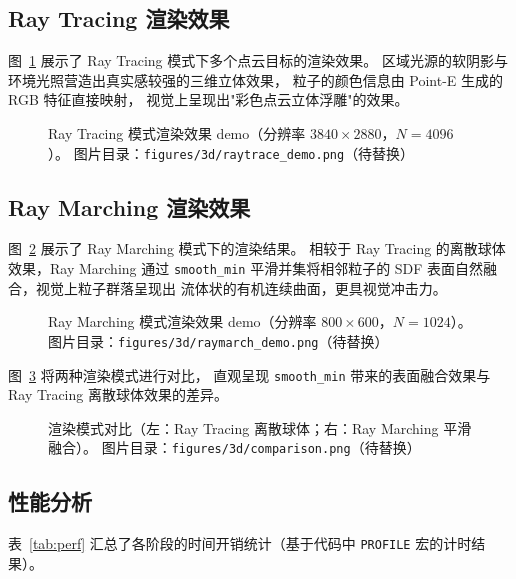 \subsection{Ray Tracing 渲染效果}

图~\ref{fig:raytrace_demo} 展示了 Ray Tracing 模式下多个点云目标的渲染效果。
区域光源的软阴影与环境光照营造出真实感较强的三维立体效果，
粒子的颜色信息由 Point-E 生成的 RGB 特征直接映射，
视觉上呈现出"彩色点云立体浮雕"的效果。

\begin{figure}[htbp]
  \centering
  \fbox{\rule{0pt}{6cm}\rule{14cm}{0pt}}
  \caption{Ray Tracing 模式渲染效果 demo（分辨率 $3840\times2880$，$N=4096$）。
           图片目录：\texttt{figures/3d/raytrace\_demo.png}（待替换）}
  \label{fig:raytrace_demo}
\end{figure}

\subsection{Ray Marching 渲染效果}

图~\ref{fig:raymarch_demo} 展示了 Ray Marching 模式下的渲染结果。
相较于 Ray Tracing 的离散球体效果，Ray Marching 通过 \texttt{smooth\_min}
平滑并集将相邻粒子的 SDF 表面自然融合，视觉上粒子群落呈现出
流体状的有机连续曲面，更具视觉冲击力。

\begin{figure}[htbp]
  \centering
  \fbox{\rule{0pt}{6cm}\rule{14cm}{0pt}}
  \caption{Ray Marching 模式渲染效果 demo（分辨率 $800\times600$，$N=1024$）。
           图片目录：\texttt{figures/3d/raymarch\_demo.png}（待替换）}
  \label{fig:raymarch_demo}
\end{figure}

图~\ref{fig:comparison} 将两种渲染模式进行对比，
直观呈现 \texttt{smooth\_min} 带来的表面融合效果与 Ray Tracing 离散球体效果的差异。

\begin{figure}[htbp]
  \centering
  \fbox{\rule{0pt}{5cm}\rule{14cm}{0pt}}
  \caption{渲染模式对比（左：Ray Tracing 离散球体；右：Ray Marching 平滑融合）。
           图片目录：\texttt{figures/3d/comparison.png}（待替换）}
  \label{fig:comparison}
\end{figure}

\subsection{性能分析}

表~\ref{tab:perf} 汇总了各阶段的时间开销统计（基于代码中
\texttt{PROFILE} 宏的计时结果）。

